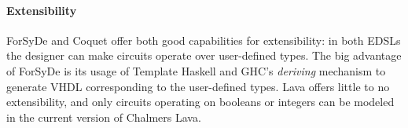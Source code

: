     \paragraph{Extensibility}
        ForSyDe and Coquet offer both good capabilities for extensibility: in both \acp{EDSL} the
        designer can make circuits operate over user-defined types. The big advantage of ForSyDe is
        its usage of Template Haskell and GHC's \emph{deriving} mechanism to generate VHDL
        corresponding to the user-defined types. Lava offers little to no extensibility, and only
        circuits operating on booleans or integers can be modeled in the current version of Chalmers
        Lava.

